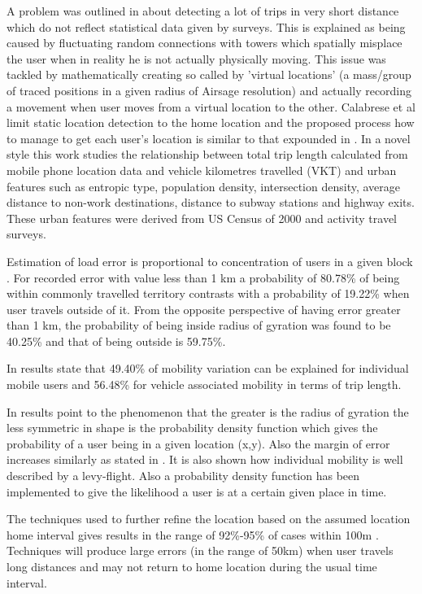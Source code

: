 \documentclass[12pt, a4paper]{report}
\theoremstyle{definition}
\theoremstyle{definition}%
\theoremstyle{definition}%
\theoremstyle{definition}%
\theoremstyle{definition}%
\theoremstyle{definition}%
\begin{document}
A problem was outlined in \cite{Calabrese2013} about detecting a lot of trips in very short distance which do not reflect statistical data given by surveys. This is explained as being caused by fluctuating random connections with towers which spatially misplace the user when in reality he is not actually physically moving. This issue was tackled by mathematically creating so called by \cite{Calabrese2013} 'virtual locations' (a mass/group of traced positions in a given radius of Airsage resolution) and actually recording a movement when user moves from a virtual location to the other. Calabrese et al limit static location detection to the home location and the proposed process how to manage to get each user's location is similar to that expounded in \cite{Hoteit2016}. In a novel style this work studies the relationship between total trip length calculated from mobile phone location data and vehicle kilometres travelled (VKT) and urban features such as entropic type, population density, intersection density, average distance to non-work destinations, distance to subway stations and highway exits. These urban features were derived from US Census of 2000 and activity travel surveys.

Estimation of load error is proportional to concentration of users in a given block \cite{Hoteit2014}. For recorded error with value less than 1 km a probability of 80.78\% of being within commonly travelled territory contrasts with a probability of 19.22\% when user travels outside of it. From the opposite perspective of having error greater than 1 km, the probability of being inside radius of gyration was found to be 40.25\% and that of being outside is 59.75\%.

In \cite{Calabrese2013} results state that 49.40\% of mobility variation can be explained for individual mobile users and 56.48\% for vehicle associated mobility in terms of trip length.    

In \cite{Gonzalez2008} results point to the phenomenon that the greater is the radius of gyration the less symmetric in shape is the probability density function which gives the probability of a user being in a given location (x,y). Also the margin of error increases similarly as stated in \cite{Hoteit2014}. It is also shown how individual mobility is well described by a levy-flight. Also a probability density function has been implemented to give the likelihood a user is at a certain given place in time.

The techniques used to further refine the location based on the assumed location home interval gives results in the range of 92\%-95\% of cases within 100m \cite{Hoteit2016}. Techniques will produce large errors (in the range of 50km) when user travels long distances and may not return to home location during the usual time interval.
\end{document}
